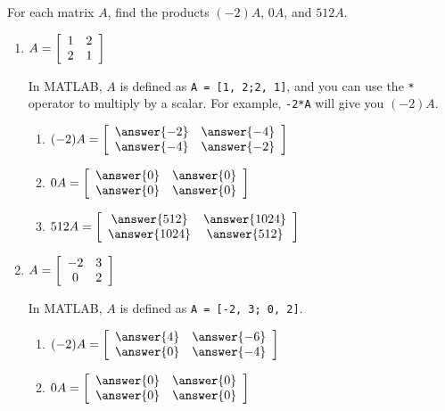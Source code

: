 \documentclass{ximera}
\author{Zack Reed}
\begin{document}
\begin{exercise}
  For each matrix $A$, find the products $(-2)A$, $0A$, and $512A$.
  \begin{enumerate}
    \item
    $A = \startmat{cc}
      1 & 2 \\
      2 & 1
    \stopmat$

    \begin{hint}
    
      In MATLAB, $A$ is defined as \texttt{A = [1, 2;2, 1]}, and you can use the \texttt{*} operator to multiply by a scalar. For example, \texttt{-2*A} will give you $(-2)A$.


    \end{hint}

    \begin{enumerate}
      \item $(-2)A = 
      \startmat{cc}
      \answer{-2} & \answer{-4} \\
      \answer{-4} & \answer{-2}
      \stopmat$

      \item $0A =
      \startmat{cc}
      \answer{0} & \answer{0} \\
      \answer{0} & \answer{0}
      \stopmat$

      \item $512A =
      \startmat{cc}
      \answer{512} & \answer{1024} \\
      \answer{1024} & \answer{512}
      \stopmat$
    \end{enumerate}
  \item
    $A = \startmat{cc}
      -2 & 3 \\
      0 & 2
    \stopmat$

    \begin{hint}
      
        In MATLAB, $A$ is defined as \texttt{A = [-2, 3; 0, 2]}.

    \end{hint}

    \begin{enumerate}
      \item $(-2)A = 
      \startmat{cc}
      \answer{4} & \answer{-6} \\
      \answer{0} & \answer{-4}
      \stopmat$

      \item $0A =
      \startmat{cc}
      \answer{0} & \answer{0} \\
      \answer{0} & \answer{0}
      \stopmat$


\end{enumerate}
\end{enumerate}
\end{exercise}
\end{document}
